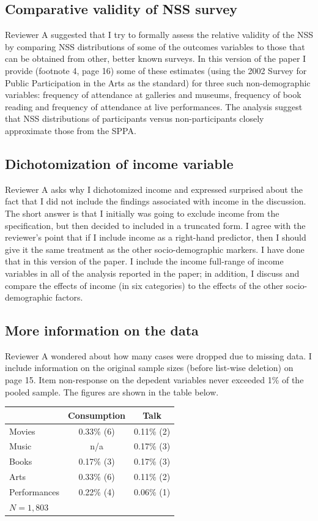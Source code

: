 \documentclass[11pt]{article}
\begin{document}
\subsection*{Comparative validity of NSS survey}
Reviewer A suggested that I try to formally assess the relative validity of the NSS by comparing NSS distributions of some of the outcomes variables to those that can be obtained from other, better known surveys.  In this version of the paper I provide (footnote 4, page 16) some of these estimates (using the 2002 Survey for Public Participation in the Arts as the standard) for three such non-demographic variables:  frequency of attendance at galleries and museums, frequency of book reading and frequency of attendance at live performances.  The analysis suggest that NSS distributions of participants versus non-participants closely approximate those from the SPPA.  

\subsection*{Dichotomization of income variable}
Reviewer A asks why I dichotomized income and expressed surprised about the fact that I did not include the findings associated with income in the discussion. The short answer is that I initially was going to exclude income from the specification, but then decided to included in a truncated form.  I agree with the reviewer's point that if I include income as a right-hand predictor, then I should give it the same treatment as the other socio-demographic markers.  I have done that in this version of the paper.    I include the income full-range of income variables in all of the analysis reported in the paper; in addition, I discuss and compare the effects of income (in six categories) to the effects of the other socio-demographic factors.

\subsection*{More information on the data}
Reviewer A wondered about how many cases were dropped due to missing data. I include information on the original sample sizes (before list-wise deletion) on page 15.   Item non-response on the depedent variables never exceeded 1\% of the pooled sample.  The figures are shown in the table below.

\begin{table}[here]
\begin{tabular}{l c c}
\hline
\hline
&Consumption&Talk\\
\hline
Movies&0.33\% (6) &0.11\% (2)\\
Music&n/a&0.17\% (3) \\
Books&0.17\% (3) &0.17\% (3) \\
Arts&0.33\% (6) &0.11\% (2) \\
Performances&0.22\% (4) &0.06\% (1) \\
\hline
$N=1,803$
\end{tabular}
\end{table}
\end{document}
